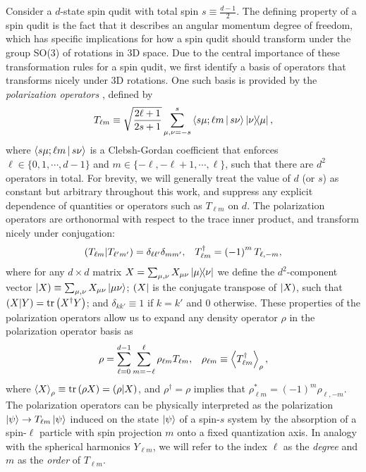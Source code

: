 \documentclass[notitlepage,twocolumn]{revtex4-2}
\newcommand{\f}[2]{\dfrac{#1}{#2}} %
\newcommand{\p}[1]{\left(#1\right)} %
\newcommand{\bk}{\Braket} %
\renewcommand{\set}[1]{\{#1\}} %
\def\obra#1{\mathinner{({#1}|}}
\def\oket#1{\mathinner{|{#1})}}
\def\obk#1{\mathinner{({#1})}}
\begin{document}
Consider a $d$-state spin qudit with total spin $s\equiv\frac{d-1}{2}$.
The defining property of a spin qudit is the fact that it describes an angular momentum degree of freedom, which has specific implications for how a spin qudit should transform under the group SO(3) of rotations in 3D space.
Due to the central importance of these transformation rules for a spin qudit, we first identify a basis of operators that transforms nicely under 3D rotations.
One such basis is provided by the {\it polarization operators} \cite{kryszewski2006positivity, bertlmann2008bloch}, defined by
\begin{align}
  T_{\ell m} \equiv \sqrt{\f{2\ell+1}{2s+1}} \sum_{\mu,\nu=-s}^s
  \bk{s\mu;\ell m|s\nu} \op{\nu}{\mu},
  \label{eq:trans_op}
\end{align}
where $\bk{s\mu;\ell m|s\nu}$ is a Clebsh-Gordan coefficient that enforces $\ell\in\set{0,1,\cdots,d-1}$ and $m\in\set{-\ell,-\ell+1,\cdots,\ell}$, such that there are $d^2$ operators in total.
For brevity, we will generally treat the value of $d$ (or $s$) as constant but arbitrary throughout this work, and suppress any explicit dependence of quantities or operators such as $T_{\ell m}$ on $d$.
The polarization operators are orthonormal with respect to the trace inner product, and transform nicely under conjugation:
\begin{align}
  \obk{T_{\ell m }|T_{\ell'm'}}
  = \delta_{\ell\ell'} \delta_{mm'},
  &&
  T_{\ell m}^\dag = \p{-1}^m T_{\ell,-m},
\end{align}
where for any $d\times d$ matrix $X=\sum_{\mu,\nu} X_{\mu\nu} \op{\mu}{\nu}$ we define the $d^2$-component vector $\oket{X} \equiv \sum_{\mu,\nu} X_{\mu\nu} \ket{\mu\nu}$; $\obra{X}$ is the conjugate transpose of $\oket{X}$, such that $\obk{X|Y}=\tr\p{X^\dag Y}$; and $\delta_{kk'}\equiv 1$ if $k=k'$ and $0$ otherwise.
These properties of the polarization operators allow us to expand any density operator $\rho$ in the polarization operator basis as
\begin{align}
  \rho = \sum_{\ell=0}^{d-1} \sum_{m=-\ell}^\ell
  \rho_{\ell m} T_{\ell m},
  &&
  \rho_{\ell m} \equiv \bk{T_{\ell m}^\dag}_\rho,
  \label{eq:trans_state}
\end{align}
where $\bk{X}_\rho\equiv\tr\p{\rho X}=\obk{\rho|X}$, and $\rho^\dag=\rho$ implies that $\rho_{\ell m}^*=\p{-1}^m\rho_{\ell,-m}$.
The polarization operators can be physically interpreted as the polarization $\ket\psi\to T_{\ell m}\ket\psi$ induced on the state $\ket\psi$ of a spin-$s$ system by the absorption of a spin-$\ell$ particle with spin projection $m$ onto a fixed quantization axis.
In analogy with the spherical harmonics $Y_{\ell m}$, we will refer to the index $\ell$ as the {\it degree} and $m$ as the {\it order} of $T_{\ell m}$.
\end{document}
